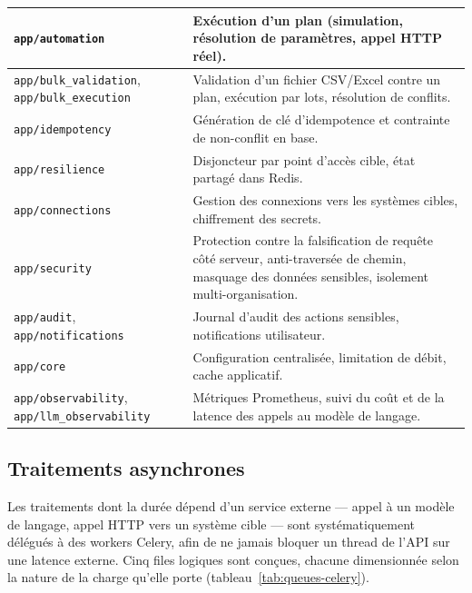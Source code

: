 \begin{longtable}{L{4cm}Y}
  \texttt{app/automation} & Exécution d'un plan (simulation, résolution de paramètres, appel HTTP réel). \\ \hline
  \texttt{app/bulk\_validation}, \texttt{app/bulk\_execution} & Validation d'un fichier CSV/Excel contre un plan, exécution par lots, résolution de conflits. \\ \hline
  \texttt{app/idempotency} & Génération de clé d'idempotence et contrainte de non-conflit en base. \\ \hline
  \texttt{app/resilience} & Disjoncteur par point d'accès cible, état partagé dans Redis. \\ \hline
  \texttt{app/connections} & Gestion des connexions vers les systèmes cibles, chiffrement des secrets. \\ \hline
  \texttt{app/security} & Protection contre la falsification de requête côté serveur, anti-traversée de chemin, masquage des données sensibles, isolement multi-organisation. \\ \hline
  \texttt{app/audit}, \texttt{app/notifications} & Journal d'audit des actions sensibles, notifications utilisateur. \\ \hline
  \texttt{app/core} & Configuration centralisée, limitation de débit, cache applicatif. \\ \hline
  \texttt{app/observability}, \texttt{app/llm\_observability} & Métriques Prometheus, suivi du coût et de la latence des appels au modèle de langage. \\ \hline
\end{longtable}

\subsection{Traitements asynchrones}

Les traitements dont la durée dépend d'un service externe — appel à un modèle de langage, appel HTTP vers un système cible — sont systématiquement délégués à des workers Celery, afin de ne jamais bloquer un thread de l'API sur une latence externe. Cinq files logiques sont conçues, chacune dimensionnée selon la nature de la charge qu'elle porte (tableau~\ref{tab:queues-celery}).

